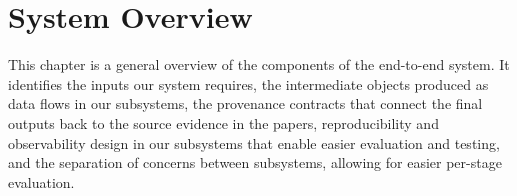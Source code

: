 
\chapter{System Overview}\label{chapter:system_overview}

This chapter is a general overview of the components of the end-to-end system. It identifies the inputs our system requires, the intermediate objects produced as data flows in our subsystems, the provenance contracts that connect the final outputs back to the source evidence in the papers, reproducibility and observability design in our subsystems that enable easier evaluation and testing, and the separation of concerns between subsystems, allowing for easier per-stage evaluation.





